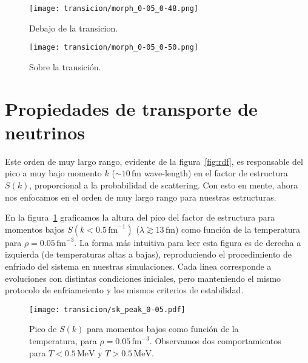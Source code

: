 \begin{figure*}[floatfix]%
  \centering
  \begin{subfigure}[h!]{0.3\columnwidth}
    \texttt{[image: transicion/morph\_0-05\_0-48.png]}
    \caption*{Debajo de la transicion.}
  \end{subfigure}
  \begin{subfigure}[h!]{0.3\columnwidth}
    \texttt{[image: transicion/morph\_0-05\_0-50.png]}
    \caption*{Sobre la transición.}
  \end{subfigure}
  \caption{Distribución espacial para $\rho=0.05\,\text{fm}^{-3}$, tanto sobre como debajo de la temperatura de transición.
    Las estructuras son similares, pero mucho más desordenadas sobre la transición.}
  \label{fig:morph}
\end{figure*}

\section{Propiedades de transporte de neutrinos}
Este orden de muy largo rango, evidente de la figura~\ref{fig:rdf}, es responsable del pico a muy bajo momento $k$ ($\sim 10\,\text{fm}$ wave-length) en el factor de estructura $S(k)$, proporcional a la probabilidad de scattering.
Con esto en mente, ahora nos enfocamos en el orden de muy largo rango para nuestras estructuras.

En la figura~\ref{fig:sk_peak_0-05} graficamos la altura del pico del factor de estructura para momentos bajos $S(k<0.5\,\text{fm}^{-1})$ ($\lambda\gtrsim13\,\text{fm}$) como función de la temperatura para $\rho=0.05\,\text{fm}^{-3}$.
La forma más intuitiva para leer esta figura es de derecha a izquierda (de temperaturas altas a bajas), reproduciendo el procedimiento de enfriado del sistema en nuestras simulaciones.
Cada línea corresponde a evoluciones con distintas condiciones iniciales, pero manteniendo el mismo protocolo de enfriameiento y los mismos criterios de estabilidad.

\begin{figure}
  \texttt{[image: transicion/sk\_peak\_0-05.pdf]}
  \caption{Pico de $S(k)$ para momentos bajos como función de la temperatura, para $\rho=0.05\,\text{fm}^{-3}$.
    Observamos dos comportamientos para $T<0.5\,\text{MeV}$ y $T>0.5\,\text{MeV}$.  }
  \label{fig:sk_peak_0-05}
\end{figure}

